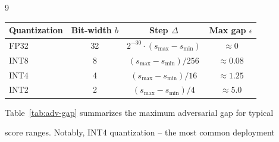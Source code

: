 \documentclass[11pt]{article}
\theoremstyle{definition}
\begin{document}
\begin{thebibliography}{9}
\begin{table}[t]
\begin{center}
\begin{tabular}{lccc}
\toprule






Quantization & Bit-width $b$ & Step $\Delta$ & Max gap $\epsilon$ \\






\midrule






FP32 & 32 & $2^{-30} \cdot (s_{\max} - s_{\min})$ & $\approx 0$ \\






INT8 & 8 & $ (s_{\max} - s_{\min}) / 256$ & $\approx 0.08$ \\






INT4 & 4 & $ (s_{\max} - s_{\min}) / 16$  & $\approx 1.25$ \\






INT2 & 2 & $ (s_{\max} - s_{\min}) / 4$   & $\approx 5.0$ \\






\bottomrule






\end{tabular}






\end{center}






\end{table}













Table~\ref{tab:adv-gap} summarizes the maximum adversarial gap for typical






score ranges.  Notably, INT4 quantization -- the most common deployment







\end{thebibliography}
\end{document}

